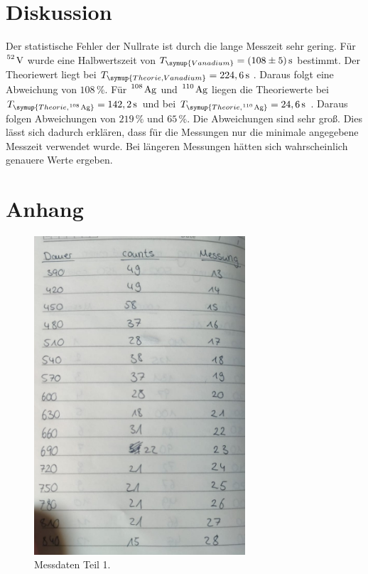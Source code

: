 \section{Diskussion}
\label{sec:Diskussion}
Der statistische Fehler der Nullrate ist durch die lange Messzeit sehr gering. Für $\ce{^52 V}$ wurde eine
Halbwertszeit von $T_{\symup{Vanadium}} = (108 \pm 5)\,\unit{\second}$ bestimmt. Der Theoriewert liegt bei
$T_{\symup{Theorie, Vanadium}} = 224,6\,\unit{\second}$ \cite{periodensystem}. Daraus folgt eine Abweichung
von $108\,\%$. Für $\ce{^108 Ag}$ und $\ce{^110 Ag}$ liegen die Theoriewerte bei
$T_{\symup{Theorie, \ce{^108 Ag}}} = 142,2\,\unit{\second}$ und bei
$T_{\symup{Theorie, \ce{^110 Ag}}} = 24,6\,\unit{\second}$ \cite{periodensystem}. Daraus folgen Abweichungen von
$219\,\%$ und $65\,\%$. Die Abweichungen sind sehr groß. Dies lässt sich dadurch erklären, dass für die Messungen
nur die minimale angegebene Messzeit verwendet wurde. Bei längeren Messungen hätten sich wahrscheinlich genauere
Werte ergeben.

\section{Anhang}
\label{sec:Anhang}
\begin{figure}
    \centering
    \includegraphics[width=0.7\textwidth]{Bilder/1.jpeg}
    \caption{Messdaten Teil 1.}
    \label{fig:M1}
\end{figure}

